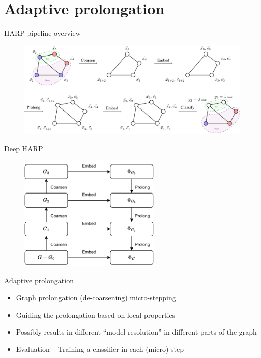 \documentclass[10pt]{beamer}
\begin{document}
\section{Adaptive prolongation}

\begin{frame}{HARP pipeline overview}
	\begin{figure}
		\centering
		\includegraphics[width=\textwidth]{images/harp-overview/harp-overview.pdf}
	\end{figure}
\end{frame}

\begin{frame}{Deep HARP}
	\begin{figure}
		\centering
		\includegraphics[width=0.6\textwidth]{images/deep-harp/deep-harp.pdf}
	\end{figure}
\end{frame}

\begin{frame}{Adaptive prolongation}
	\begin{itemize}
		\item Graph prolongation (de-coarsening) micro-stepping
		\item Guiding the prolongation based on local properties
		\item Possibly results in different \enquote{model resolution} in different parts of the graph
		\item Evaluation -- Training a classifier in each (micro) step
	\end{itemize}
\end{frame}
\end{document}
